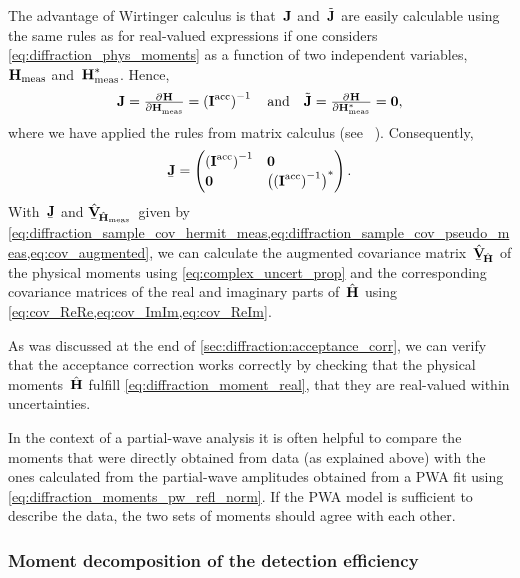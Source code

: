 The advantage of Wirtinger calculus is that~$\bm{\mathrm{J}}$
and~$\tilde{\bm{\mathrm{J}}}$ are easily calculable using the same rules as
for real-valued expressions if one considers
\cref{eq:diffraction_phys_moments} as a function of two independent
variables, ~$\bm{\mathrm{H}}_\text{meas}$ and~$\bm{\mathrm{H}}_\text{meas}^*$.
Hence,
\begin{equation}
  \mat{J}
  = \pd{\vect{H}}{\vect{H}_\text{meas}}
  = \rBrk[0]{\mat{I}^\text{acc}}^{-1}
  \quad\text{and}\quad
  \tilde{\mat{J}}
  = \pd{\vect{H}}{{\vect{H}_\text{meas}^*}}
  = \mat{0},
\end{equation}
where we have applied the rules from matrix calculus (see \eg\
).  Consequently,
\begin{equation}
  \underaccent{\bar}{\mat{J}}
  = \begin{pmatrix*}[l]
    \rBrk[0]{\mat{I}^\text{acc}}^{-1} & \mat{0} \\
    \mat{0}                           & \rBrk[1]{\rBrk[0]{\mat{I}^\text{acc}}^{-1}}^*
  \end{pmatrix*}.
\end{equation}
With~$\underaccent{\bar}{\mat{J}}$ and
$\hat{\underaccent{\bar}{\covMatSym}}_{\!\hat{\vect{H}}_\text{meas}}$~given
by
\cref{eq:diffraction_sample_cov_hermit_meas,eq:diffraction_sample_cov_pseudo_meas,eq:cov_augmented},
we can calculate the augmented covariance
matrix~$\hat{\underaccent{\bar}{\covMatSym}}_{\!\hat{\vect{H}}}$ of
the physical moments using \cref{eq:complex_uncert_prop} and the
corresponding covariance matrices of the real and imaginary parts
of~$\hat{\bm{\mathrm{H}}}$ using \cref{eq:cov_ReRe,eq:cov_ImIm,eq:cov_ReIm}.

As was discussed at the end of \cref{sec:diffraction:acceptance_corr},
we can verify that the acceptance correction works correctly by
checking that the physical moments~$\hat{\bm{\mathrm{H}}}$ fulfill
\cref{eq:diffraction_moment_real}, \ie that they are real-valued
within uncertainties.

In the context of a partial-wave analysis it is often helpful to
compare the moments that were directly obtained from data (as
explained above) with the ones calculated from the partial-wave
amplitudes obtained from a PWA fit using
\cref{eq:diffraction_moments_pw_refl_norm}.  If the PWA model is sufficient
to describe the data, the two sets of moments should agree with each
other.


\subsubsection{Moment decomposition of the detection efficiency}%
\label{sec:diffraction:acceptance_moment_decomp}

